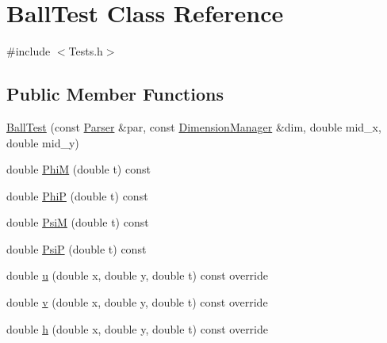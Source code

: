 \hypertarget{classBallTest}{}\section{Ball\+Test Class Reference}
\label{classBallTest}


{\ttfamily \#include $<$Tests.\+h$>$}

\subsection*{Public Member Functions}
\begin{DoxyCompactItemize}
\item 
\hyperlink{classBallTest_abbe9e3da5970260516dfdcdf52a280ef}{Ball\+Test} (const \hyperlink{structParser}{Parser} \&par, const \hyperlink{structDimensionManager}{Dimension\+Manager} \&dim, double mid\+\_\+x, double mid\+\_\+y)
\item 
double \hyperlink{classBallTest_a77c48f3d148284fea5ad1541bb1cc907}{PhiM} (double t) const
\item 
double \hyperlink{classBallTest_a998742333900f49563e8423abb88cd50}{PhiP} (double t) const
\item 
double \hyperlink{classBallTest_a4ffad249b636e80473fcc0bec99d1ca6}{PsiM} (double t) const
\item 
double \hyperlink{classBallTest_ac652d725b7db4c4de6a074ef4b973b6f}{PsiP} (double t) const
\item 
double \hyperlink{classBallTest_ad2fab0cdc8849ddaf466225e33c0721f}{u} (double x, double y, double t) const override
\item 
double \hyperlink{classBallTest_a37f7bbe3960912d5284acf91eea382b6}{v} (double x, double y, double t) const override
\item 
double \hyperlink{classBallTest_a54b33ed14108d7c5c007004ffefda374}{h} (double x, double y, double t) const override
\end{DoxyCompactItemize}
